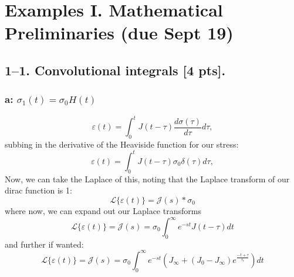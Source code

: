 

\section*{Examples I. Mathematical Preliminaries (due Sept 19)}
\label{PS1}

\bigskip
\subsection*{1--1. \textbf{Convolutional integrals} [4 pts].} 
\subsubsection*{a: $\sigma_1(t) = \sigma_0 H(t)$}

\begin{equation}
    \varepsilon(t) = \int_0^t J(t-\tau) \frac{d\sigma(\tau)}{d\tau} d\tau,
\end{equation}
subbing in the derivative of the Heaviside function for our stress:
\begin{equation}
    \varepsilon(t) = \int_0^t J(t-\tau) \sigma_0\delta(\tau) d\tau,
\end{equation}
Now, we can take the Laplace of this, noting that the Laplace transform of our dirac function is 1:
\begin{equation}
    \mathcal{L}\{\varepsilon(t)\} = \mathcal{J}(s)*\sigma_0
\end{equation}
where now, we can expand out our Laplace transforms
\begin{equation}
    \mathcal{L}\{\varepsilon(t)\}=\mathcal{J}(s) = \sigma_0\int_0^{\infty}e^{-st}J(t-\tau)dt 
\end{equation}
and further if wanted:
\begin{equation}
    \mathcal{L}\{\varepsilon(t)\}=\mathcal{J}(s) = \sigma_0\int_0^{\infty}e^{-st}(J_\infty + (J_0-J_\infty)e^{\frac{-t+\tau}{\tau_c}})dt 
\end{equation}



